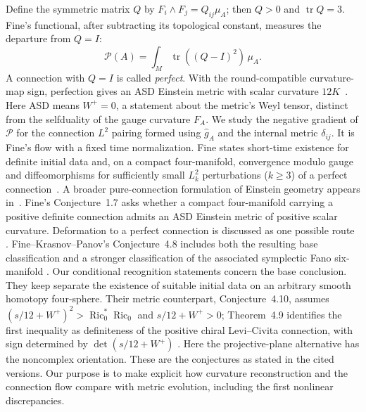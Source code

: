 \documentclass[11pt]{article}
\numberwithin{equation}{section}
\theoremstyle{definition}
\theoremstyle{remark}
\DeclareMathOperator{\Ric}{Ric}
\DeclareMathOperator{\tr}{tr}
\begin{document}
Define the symmetric matrix \(Q\) by \(F_i\wedge F_j=Q_{ij}\mu_A\);
then \(Q>0\) and \(\tr Q=3\). Fine's functional, after subtracting its
topological constant, measures the departure from \(Q=I\):
\begin{equation}\label{eq:intro-energy}
 \mathcal P(A)=\int_M\tr((Q-I)^2)\,\mu_A.
\end{equation}
A connection with \(Q=I\) is called \emph{perfect}. With the
round-compatible curvature-map sign, perfection gives an ASD Einstein
metric with scalar curvature \(12K\)~\cite{Fine2011}. Here ASD means
\(W^+=0\), a statement about the metric's Weyl tensor, distinct from the
selfduality of the gauge curvature \(F_A\).
We study the negative gradient of \(\mathcal P\) for the connection
\(L^2\) pairing formed using \(\widehat g_A\) and the internal metric
\(\delta_{ij}\). It is Fine's flow with a fixed time normalization.
Fine states short-time existence for definite initial data and, on a compact
four-manifold, convergence modulo gauge and diffeomorphisms for sufficiently
small $L^2_k$ perturbations ($k\geq3$) of a perfect connection~\cite{Fine2011}.
A broader pure-connection formulation of Einstein geometry appears
in~\cite{FineKrasnovPanov2014}.
Fine's Conjecture~1.7 asks whether a compact four-manifold carrying a
positive definite connection admits an ASD Einstein metric of positive
scalar curvature. Deformation to a perfect connection is discussed as one
possible route \cite[Conjecture 1.7 and Section 1.5]{Fine2011}. Fine--Krasnov--Panov's Conjecture~4.8
includes both the resulting base classification and a stronger
classification of the associated symplectic Fano six-manifold
\cite[Conjecture 4.8]{FineKrasnovPanov2014}. Our conditional recognition
statements concern the base conclusion. They keep separate the existence
of suitable initial data on an arbitrary smooth homotopy four-sphere.
Their metric counterpart, Conjecture~4.10, assumes
$(s/12+W^+)^2>\Ric_0^*\Ric_0$ and $s/12+W^+>0$;
Theorem~4.9 identifies the first inequality as definiteness of the
positive chiral Levi--Civita connection, with sign determined by
$\det(s/12+W^+)$ \cite[Theorem 4.9 and Conjecture 4.10]{FineKrasnovPanov2014}.
Here the projective-plane alternative has the noncomplex orientation.
These are the conjectures as stated in the cited versions.
Our purpose is to make explicit how curvature reconstruction and the
connection flow compare with metric evolution, including the first
nonlinear discrepancies.
\end{document}
